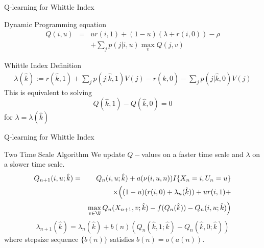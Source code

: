 \documentclass{beamer}
\begin{document}
\begin{frame}{Q-learning for Whittle Index}
\begin{block}{Dynamic Programming equation}
\begin{eqnarray}
Q(i,u) &=& ur(i,1) + (1-u)(\lambda + r(i,0)) - \rho\nonumber \\
&& + \sum_j p(j|i,u)\max_v Q(j,v)\nonumber \label{Q-DP}
\end{eqnarray}
\end{block}
\begin{block}{Whittle Index Definition}
\begin{eqnarray}
\lambda(\hat{k}) := r(\hat{k},1) + \sum_jp(j | \hat{k}, 1)V(j)
- r(\hat{k},0) - \sum_jp(j | \hat{k}, 0)V(j)\nonumber \label{Windex0}
\end{eqnarray}
This is equivalent to solving
\begin{equation}
Q(\hat{k}, 1) - Q(\hat{k}, 0)=0\nonumber \label{Windex}
\end{equation}
for $\lambda = \lambda(\hat{k})$
\end{block}
\end{frame}

\begin{frame}{Q-learning for Whittle Index}
\begin{block}{Two Time Scale Algorithm}
We update $Q-$values on a faster time scale and $\lambda$ on a slower time scale.
\begin{eqnarray}
Q_{n+1}(i,u;\hat{k}) &=& Q_n(i,u;\hat{k})  +   a(\nu(i,u,n))I\{X_n = i, U_n = u\} \nonumber \\
&& \times \Big((1 - u)(r(i,0) + \lambda_n(\hat{k})) + ur(i,1) +  \nonumber \\
&& \max_{v\in\U}Q_n(X_{n+1},v;\hat{k})  - f(Q_n(\hat{k})) - Q_n(i,u;\hat{k})\Big)\nonumber
\end{eqnarray}
\begin{equation}
\lambda_{n+1}(\hat{k}) = \lambda_n(\hat{k}) + b(n) \left( Q_n(\hat{k},1;\hat{k}) - Q_n(\hat{k},0;\hat{k}) \right)\nonumber
\label{lambda-update}
\end{equation}
where stepsize sequence $\{b(n)\}$ satisfies $b(n) = o(a(n))$.
\end{block}
\end{frame}
\end{document}
